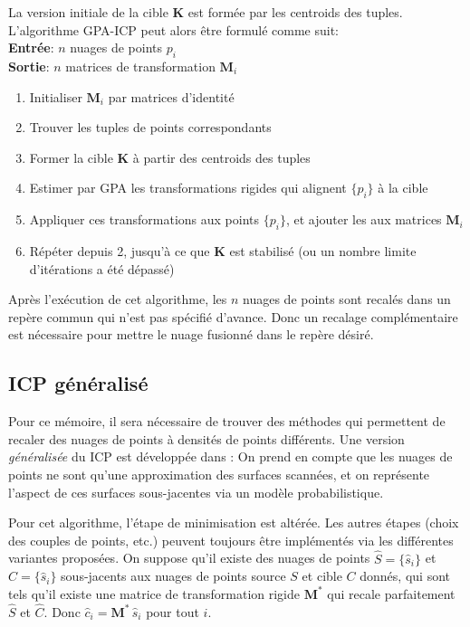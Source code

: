 \documentclass[a4paper,10pt]{scrreprt}
\begin{document}
La version initiale de la cible $\mathbf{K}$ est formée par les centroids des tuples. L'algorithme GPA-ICP peut alors être formulé comme suit: \cite{Told2010} \\
\textbf{Entrée}: $n$ nuages de points ${p_i}$ \\
\textbf{Sortie}: $n$ matrices de transformation ${\mathbf{M}_i}$
\begin{enumerate}
	\item Initialiser ${\mathbf{M}_i}$ par matrices d'identité
	\item Trouver les tuples de points correspondants
	\item Former la cible $\mathbf{K}$ à partir des centroids des tuples
	\item Estimer par GPA les transformations rigides qui alignent $\{p_i\}$ à la cible
	\item Appliquer ces transformations aux points $\{p_i\}$, et ajouter les aux matrices ${\mathbf{M}_i}$
	\item Répéter depuis 2, jusqu'à ce que $\mathbf{K}$ est stabilisé (ou un nombre limite d'itérations a été dépassé)
\end{enumerate} 
Après l'exécution de cet algorithme, les $n$ nuages de points sont recalés dans un repère commun qui n'est pas spécifié d'avance. Donc un recalage complémentaire est nécessaire pour mettre le nuage fusionné dans le repère désiré.

\subsection{ICP généralisé}
Pour ce mémoire, il sera nécessaire de trouver des méthodes qui permettent de recaler des nuages de points à densités de points différents. Une version \emph{généralisée} du ICP est développée dans \cite{Sega2009}: On prend en compte que les nuages de points ne sont qu'une approximation des surfaces scannées, et on représente l'aspect de ces surfaces sous-jacentes via un modèle probabilistique.

Pour cet algorithme, l'étape de minimisation est altérée. Les autres étapes (choix des couples de points, etc.) peuvent toujours être implémentés via les différentes variantes proposées. On suppose qu'il existe des nuages de points $\hat{S} = \{ \hat{s}_i \}$ et $\hat{C} = \{ \hat{s}_i \}$ sous-jacents aux nuages de points source $S$ et cible $C$ donnés, qui sont tels qu'il existe une matrice de transformation rigide $\mathbf{M}^*$ qui recale parfaitement $\hat{S}$ et $\hat{C}$. Donc $\hat{c}_i = \mathbf{M}^* \, \hat{s}_i$ pour tout $i$.
\end{document}
